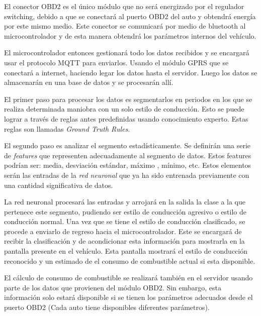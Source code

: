 El conector OBD2 es el único módulo que no será energizado por el regulador switching, debido a que se conectará al puerto OBD2 del auto y obtendrá energía por este mismo medio. Este conector se comunicará por medio de bluetooth al microcontrolador y de esta manera obtendrá los parámetros internos del vehículo.

El microcontrolador entonces gestionará todo los datos recibidos y se encargará usar el protocolo MQTT para enviarlos. Usando el módulo GPRS que se conectará a internet, haciendo legar los datos hasta el servidor. Luego los datos se almacenarán en una base de datos y se procesarán allí.

El primer paso para procesar los datos es segmentarlos en periodos en los que se realiza determinada maniobra con un solo estilo de conducción. Esto se puede lograr a través de reglas antes predefinidas usando conocimiento experto. Estas reglas son llamadas {\it Ground Truth Rules}.

El segundo paso es analizar el segmento estadísticamente. Se definirán una serie de {\it features} que representen adecuadamente al segmento de datos. Estos features podrían ser: media, desviación estándar, máximo , mínimo, etc. Estos elementos serán las entradas de la {\it red neuronal} que ya ha sido entrenada previamente con una cantidad significativa de datos.

La red neuronal procesará las entradas y arrojará en la salida la clase a la que pertenece este segmento, pudiendo ser estilo de conducción agresivo o estilo de conducción normal. Una vez que se tiene el estilo de conducción clasificado, se procede a enviarlo de regreso hacia el microcontrolador. Este se encargará de recibir la clasificación y de acondicionar esta información para mostrarla en la pantalla presente en el vehículo. Esta pantalla mostrará el estilo de conducción reconocido y un estimado de el consumo de combustible actual si esta disponible.

El cálculo de consumo de combustible se realizará también en el servidor usando parte de los datos que provienen del módulo OBD2. Sin embargo,  esta información solo estará disponible si se tienen los parámetros adecuados desde el puerto OBD2 (Cada auto tiene disponibles diferentes parámetros).

